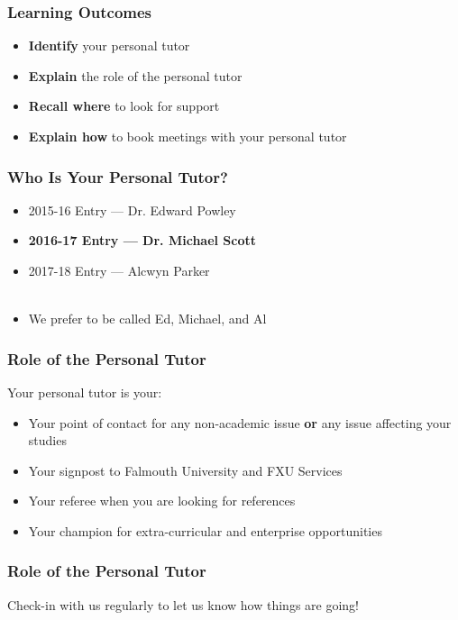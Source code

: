\begin{frame}
	\frametitle{Learning Outcomes}
	\begin{itemize}
		\item \textbf{Identify} your personal tutor
		\item \textbf{Explain} the role of the personal tutor
		\item \textbf{Recall where} to look for support
		\item \textbf{Explain how} to book meetings with your personal tutor
	\end{itemize}
\end{frame}

\begin{frame}
	\frametitle{Who Is Your Personal Tutor?}	
	\begin{itemize}
		\item 2015-16 Entry --- Dr. Edward Powley \pause
		\item \textbf{2016-17 Entry --- Dr. Michael Scott} \pause
		\item 2017-18 Entry --- Alcwyn Parker \pause 
		\\~\\
		\item We prefer to be called Ed, Michael, and Al
	\end{itemize}
\end{frame}

\begin{frame}
	\frametitle{Role of the Personal Tutor}	
	
	Your personal tutor is your:
	
	\begin{itemize}
		\item Your point of contact for any non-academic issue \textbf{or} any issue affecting your studies
		\item Your signpost to Falmouth University and FXU Services
		\item Your referee when you are looking for references
		\item Your champion for extra-curricular and enterprise opportunities 
	\end{itemize}
\end{frame}

\begin{frame}
	\frametitle{Role of the Personal Tutor}	
	
	\begin{center}
		Check-in with us regularly to let us know how things are going!
	\end{center}
\end{frame}

